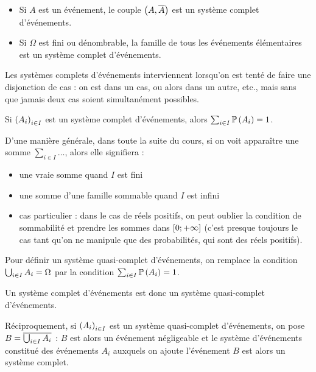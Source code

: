 \begin{ex}
\begin{itemize}
    \item Si \(A\) est un événement, le couple \(\left(A,\overline{A}\right)\) est un système complet d'événements. \\
    \item Si \(\Omega\) est fini ou dénombrable, la famille de tous les événements élémentaires est un système complet d'événements.
\end{itemize}
\end{ex}

Les systèmes complets d'événements interviennent lorsqu'on est tenté de faire une disjonction de cas : on est dans un cas, ou alors dans un autre, etc., mais sans que jamais deux cas soient simultanément possibles.

Si \(\left(A_i\right)_{i\in I}\) est un système complet d'événements, alors \(\sum_{i\in I}\mathbb{P}\left(A_i\right)=1\).

\begin{rem}
D'une manière générale, dans toute la suite du cours, si on voit apparaître une somme \(\sum_{i\in I}\dots\), alors elle signifiera :

\begin{itemize}
    \item une vraie somme quand \(I\) est fini \\
    \item une somme d'une famille sommable quand \(I\) est infini \\
    \item cas particulier : dans le cas de réels positifs, on peut oublier la condition de sommabilité et prendre les sommes dans \(\left[0;+\infty\right]\) (c'est presque toujours le cas tant qu'on ne manipule que des probabilités, qui sont des réels positifs).
\end{itemize}
\end{rem}

\begin{defi}
Pour définir un système quasi-complet d'événements, on remplace la condition \(\bigcup_{i\in I}A_i=\Omega\) par la condition \(\sum_{i\in I}\mathbb{P}\left(A_i\right)=1\).
\end{defi}

Un système complet d'événements est donc un système quasi-complet d'événements.

Réciproquement, si \(\left(A_i\right)_{i\in I}\) est un système quasi-complet d'événements, on pose \(B=\overline{\bigcup_{i\in I}A_i}\) : \(B\) est alors un événement négligeable et le système d'événements constitué des événements \(A_i\) auxquels on ajoute l'événement \(B\) est alors un système complet.

